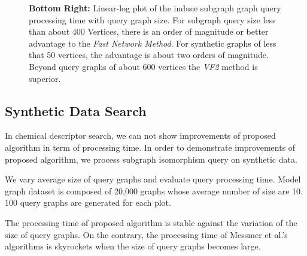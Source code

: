 \begin{figure}[h]
{\textbf{Bottom Right:} Linear-log plot of the induce subgraph graph query processing time with query graph size. For subgraph query size less than about 400 Vertices, there is an order of magnitude or better advantage to the \textit{Fast Network Method}. For synthetic graphs of less that 50 vertices, the advantage is about two orders of magnitude. Beyond query graphs of about 600 vertices the \textit{VF2} method is superior.
}
\label{fig:fig91}
\end{figure}
%

\subsection{Synthetic Data Search}
In chemical descriptor search, we can not show improvements of proposed algorithm in term of processing time.
In order to demonstrate improvements of proposed algorithm, we process subgraph isomorphism query on synthetic data.

We vary average size of query graphs and evaluate query processing time.
Model graph dataset is composed of 20,000 graphs whose average number of size are 10.
100 query graphs are generated for each plot.



The processing time of proposed algorithm is stable against the variation of the size of query graphs.
On the contrary, the processing time of Messmer et al.'s algorithms is skyrockets when the size of query graphs becomes large.

